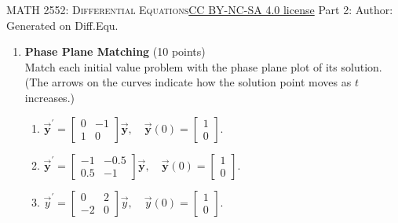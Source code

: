 \newpage\handout
{\textsc{MATH 2552: Differential Equations}}{\href{https://creativecommons.org/licenses/by-nc-sa/4.0/}{CC BY-NC-SA 4.0 license}}
{Part 2: }
{Author: \href{\HandoutAuthorUrl}{\HandoutAuthor}}{Generated on \generatedOn}
{Diff.Equ.}

\newpage

\begin{enumerate}

  \item \textbf{Phase Plane Matching} (10 points)\\
  Match each initial value problem with the phase plane plot of its solution. (The arrows on the curves indicate how the solution point moves as $t$ increases.)
  \begin{enumerate}[label=\arabic*.]
    \item $\overrightarrow{\boldsymbol{y}}^{\prime}=\left[\begin{array}{rr}0 & -1 \\ 1 & 0\end{array}\right] \overrightarrow{\boldsymbol{y}}, \quad \overrightarrow{\boldsymbol{y}}(0)=\left[\begin{array}{l}1 \\ 0\end{array}\right]$.\\
    \begin{subanswer}
    \end{subanswer}
    \item $\overrightarrow{\boldsymbol{y}}^{\prime}=\left[\begin{array}{rr}-1 & -0.5 \\ 0.5 & -1\end{array}\right] \overrightarrow{\boldsymbol{y}}, \quad \overrightarrow{\boldsymbol{y}}(0)=\left[\begin{array}{l}1 \\ 0\end{array}\right]$.\\
    \begin{subanswer}
    \end{subanswer}
    \item $\vec{y}^{\prime}=\left[\begin{array}{rr}0 & 2 \\ -2 & 0\end{array}\right] \vec{y}, \quad \vec{y}(0)=\left[\begin{array}{l}1 \\ 0\end{array}\right]$.\\

\end{enumerate}
\end{enumerate}
